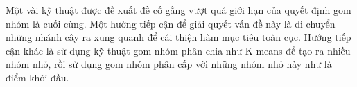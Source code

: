 Một vài kỹ thuật được đề xuất đề cố gắng vượt quá giới hạn của quyết định gom nhóm là cuối cùng.
Một hường tiếp cận để giải quyết vấn đề này là di chuyển những nhánh cây ra xung quanh để cái thiện hàm mục tiêu toàn cục.
Hướng tiếp cận khác là sử dụng kỹ thuật gom nhóm phân chia như K-means để tạo ra nhiều nhóm nhỏ, rồi sử dụng gom nhóm phân cấp với những nhóm nhỏ này như là điểm khởi đầu.






 
